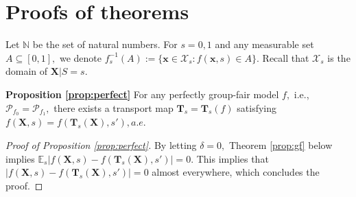 \documentclass[10pt]{article} %
\newtheorem{definition}[theorem]{Definition}
\begin{document}
\section{Proofs of theorems}\label{sec:appen_pfs}





Let $\mathbb{N}$ be the set of natural numbers.
For $s=0,1$ and any measurable set $A \subseteq [0, 1],$ we denote 
$ f_s^{-1}(A) := \{ \mathbf{x} \in \mathcal{X}_s : f(\mathbf{x},s) \in A \}. $
Recall that $\mathcal{X}_{s}$ is the domain of $\mathbf{X} | S = s.$

\textbf{Proposition \ref{prop:perfect}}
    For any perfectly group-fair model $f,$ i.e., $\mathcal{P}_{f_{0}} = \mathcal{P}_{f_{1}},$
    there exists a transport map $\mathbf{T}_{s} = \mathbf{T}_{s}(f)$ satisfying 
    $
    f \left( \mathbf{X}, s \right) = f \left( \mathbf{T}_{s} (\mathbf{X}) , s' \right), a.e.
    $

\begin{proof}[Proof of Proposition \ref{prop:perfect}]
    By letting $\delta = 0,$ Theorem \ref{prop:gf} below implies $ \mathbb{E}_{s} \left\vert f \left( \mathbf{X}, s \right) - f \left( \mathbf{T}_{s} (\mathbf{X}) , s' \right) \right\vert = 0.$
    This implies that $\left\vert f \left( \mathbf{X}, s \right) - f \left( \mathbf{T}_{s} (\mathbf{X}) , s' \right) \right\vert = 0$ almost everywhere, which concludes the proof.
\end{proof}
\end{document}
